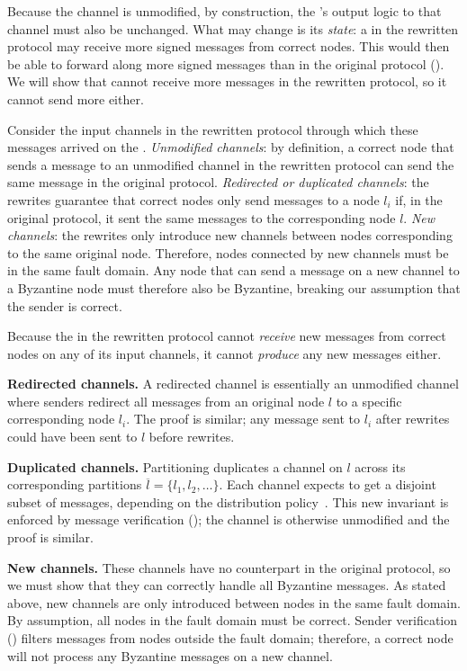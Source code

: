 Because the channel is unmodified, by construction, the \randomSimulator{}'s output logic to that channel must also be unchanged.
What may change is its \emph{state}: a \randomSimulator{} in the rewritten protocol may receive more signed messages from correct nodes.
This \randomSimulator{} would then be able to forward along more signed messages than in the original protocol ().
We will show that \randomSimulator{} cannot receive more messages in the rewritten protocol, so it cannot send more either.

Consider the input channels in the rewritten protocol through which these messages arrived on the \randomSimulator{}.
\textit{Unmodified channels}: by definition, a correct node that sends a message to an unmodified channel in the rewritten protocol can send the same message in the original protocol.
\textit{Redirected or duplicated channels}: the rewrites guarantee that correct nodes only send messages to a node $l_i$ if, in the original protocol, it sent the same messages to the corresponding node $l$.
\textit{New channels}: the rewrites only introduce new channels between nodes corresponding to the same original node.
Therefore, nodes connected by new channels must be in the same fault domain.
Any node that can send a message on a new channel to a Byzantine node must therefore also be Byzantine, breaking our assumption that the sender is correct.

Because the \randomSimulator{} in the rewritten protocol cannot \emph{receive} new messages from correct nodes on any of its input channels, it cannot \emph{produce} any new messages either.

\textbf{Redirected channels.}
A redirected channel is essentially an unmodified channel where senders redirect all messages from an original node $l$ to a specific corresponding node $l_i$.
The proof is similar; any message sent to $l_i$ after rewrites could have been sent to $l$ before rewrites. 

\textbf{Duplicated channels.}
Partitioning duplicates a channel on $l$ across its corresponding partitions $\overline{l} = \{l_1, l_2, \ldots\}$.
Each channel expects to get a disjoint subset of messages, depending on the distribution policy~\cite{autocomp}.
This new invariant is enforced by message verification (); the channel is otherwise unmodified and the proof is similar.

\textbf{New channels.}
These channels have no counterpart in the original protocol, so we must show that they can correctly handle all Byzantine messages.
As stated above, new channels are only introduced between nodes in the same fault domain.
By assumption, all nodes in the fault domain must be correct.
Sender verification () filters messages from nodes outside the fault domain; therefore, a correct node will not process any Byzantine messages on a new channel.

